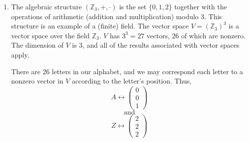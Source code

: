 \documentclass[12pt]{amsart}
\begin{document}
\begin{enumerate}
\begin{enumerate}
Hint: Consider the base 3 representation of integers and induct on $p$, the {\it number} of symbols in the base 3 representation.
\begin{proof}
Assume that every positive integer $n$ can be uniquely represented as the sum or difference of powers of 3. We will proceed by induction on $p$, the number of symbols in the base 3 representation of $n$.

Notice that any time we're given 2 as a coefficient in the sum/difference of powers of 3 representation, we can rewrite it as $2 = 3 -1$. Therefore, for any $i\in\mathbb Z$ we have that:
\[ 2 \cdot 3^i = 3\cdot 3^i - 1\cdot 3^i = 3^{i+1} - 3^i. \]
This allows us to ``shift left" the base 3 representation of $n$.

As a base case, the proposition is true because when $p=1$, we find that $1=3^0$. Next, assume that the proposition is true for $p=k$. We want to show that the supposition is true for $p=k+1$.

In other words, $p=k+1$ implies we are adding another position to the base 3 representation. We really only care if the new position contains a 2. If the {k+1}th position is occupied by a 2, then $2\cdot 3^{k+1}$ is in the base 3 representation. However, since $2\cdot 3^{k+1} = 3^{k+2} - 3^{k+2}$, we can convert any 2 we find such that every digit in the base 3 representation is either 0 or $\pm 1$.

Hence, every $n$ can be uniquely represented as the sum or difference of powers of 3.
\end{proof}

\end{enumerate}

\item The algebraic structure $(\mathbb Z_3, +, \cdot)$ is the set $\{0,1,2\}$ together with the operations of arithmetic (addition and multiplication) modulo 3. This structure is an example of a (finite) field. The vector space $V = (\mathbb Z_3)^3$ is a vector space over the field $\mathbb Z_3$. $V$ has $3^3=27$ vectors, 26 of which are nonzero. The dimension of $V$ is 3, and all of the results associated with vector spaces apply.

There are 26 letters in our alphabet, and we may correspond each letter to a nonzero vector in $V$ according to the letter's position. Thus,
\[A \leftrightarrow \begin{pmatrix}
0\\
0\\
1\end{pmatrix}\]
\[ \textrm{and} \]
\[Z \leftrightarrow \begin{pmatrix}
2\\
2\\
2\end{pmatrix} \]


\end{enumerate}
\end{document}
